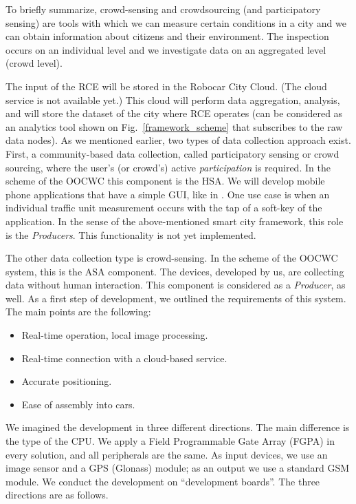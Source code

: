 \documentclass[b5paper,12pt]{report}
\theoremstyle{definition}
\begin{document}
To briefly summarize, crowd-sensing and crowdsourcing (and participatory sensing) are tools with which we can measure certain conditions in a city and we can obtain information about citizens and their environment. The inspection occurs on an individual level and we investigate data on an aggregated level (crowd level).

The input of the RCE will be stored in the Robocar City Cloud. (The cloud service is not available yet.) This cloud will perform data aggregation, analysis, and will store the dataset of the city where RCE operates (can be considered as an analytics tool shown on Fig.~\ref{framework_scheme} that subscribes to the raw data nodes). As we mentioned earlier, two types of data collection approach exist. First, a community-based data collection, called participatory sensing or crowd sourcing, where the user's (or crowd's) active \textit{participation} is required. In the scheme of the OOCWC this component is the HSA. We will develop mobile phone applications that have a simple GUI, like in \cite{besenczi2013kozossegi}. One use case is when an individual traffic unit measurement occurs with the tap of a soft-key of the application. In the sense of the above-mentioned smart city framework, this role is the \textit{Producers}. This functionality is not yet implemented.

The other data collection type is crowd-sensing. In the scheme of the OOCWC system, this is the ASA component. The devices, developed by us, are collecting data without human interaction. This component is considered as a \textit{Producer}, as well. As a first step of development, we outlined the requirements of this system. The main points are the following:

\begin{itemize}
\item Real-time operation, local image processing.
\item Real-time connection with a cloud-based service.
\item Accurate positioning.
\item Ease of assembly into cars.
\end{itemize}

We imagined the development in three different directions. The main difference is the type of the CPU. We apply a Field Programmable Gate Array (FGPA) in every solution, and all peripherals are the same. As input devices, we use an image sensor and a GPS (Glonass) module; as an output we use a standard GSM module. We conduct the development on \enquote{development boards}. The three directions are as follows.
\end{document}
